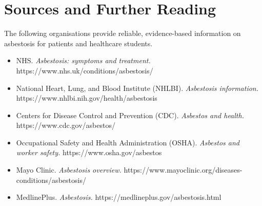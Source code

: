 \section*{Sources and Further Reading}
The following organisations provide reliable, evidence-based information on asbestosis for patients and healthcare students.

\begin{itemize}
    \item NHS. \textit{Asbestosis: symptoms and treatment.} https://www.nhs.uk/conditions/asbestosis/
    \item National Heart, Lung, and Blood Institute (NHLBI). \textit{Asbestosis information.} https://www.nhlbi.nih.gov/health/asbestosis
    \item Centers for Disease Control and Prevention (CDC). \textit{Asbestos and health.} https://www.cdc.gov/asbestos/
    \item Occupational Safety and Health Administration (OSHA). \textit{Asbestos and worker safety.} https://www.osha.gov/asbestos
    \item Mayo Clinic. \textit{Asbestosis overview.} https://www.mayoclinic.org/diseases-conditions/asbestosis/
    \item MedlinePlus. \textit{Asbestosis.} https://medlineplus.gov/asbestosis.html
\end{itemize}
